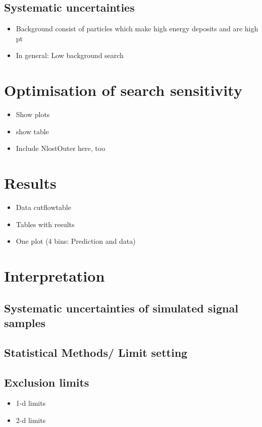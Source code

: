 \section{Systematic uncertainties}
\label{sec:SysUncertaintiesBkg}


\begin{itemize}
\item Background consist of particles which make high energy deposits and are high pt
\item In general: Low background search
\end{itemize}
\chapter{Optimisation of search sensitivity}
\label{sec:Optimisation}
\begin{itemize}
\item Show plots
\item show table
\item Include NlostOuter here, too
\end{itemize}


\chapter{Results}
\label{sec:Results}
\begin{itemize}
\item Data cutflowtable
\item Tables with results
\item One plot (4 bins: Prediction and data)
\end{itemize}

\chapter{Interpretation}
\label{sec:Interpretation}
\section{Systematic uncertainties of simulated signal samples}
\section{Statistical Methods/ Limit setting}
\section{Exclusion limits}
\begin{itemize}
\item 1-d limits
\item 2-d limits
\end{itemize}

